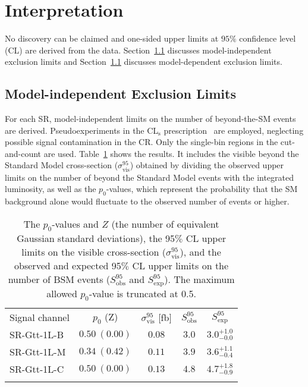 
\section{Interpretation}\label{mbinter}

No discovery can be claimed and one-sided upper limits at $95\%$ confidence
level (CL) are derived from the data. Section~\ref{mb:midel} discusses
model-independent exclusion limits and Section~\ref{mb:midel} discusses
model-dependent exclusion limits.


\subsection{Model-independent Exclusion Limits}\label{mb:midel}

For each SR, model-independent limits on the number of beyond-the-SM events are
derived. Pseudoexperiments in the CL$_{\text{s}}$
prescription~\cite{Read:2002hq} are employed, neglecting possible signal
contamination in the CR. Only the single-bin regions in the cut-and-count are
used. Table~\ref{mod-ind-lim} shows the results. It includes the visible beyond
the Standard Model cross-section ($\sigma_{\text{vis}}^{95}$) obtained by
dividing the observed upper limits on the number of beyond the Standard Model
events with the integrated luminosity, as well as the $p_0$-values, which
represent the probability that the SM background alone would fluctuate to the
observed number of events or higher.

\begin{table}[H]
	\centering
	\small
	\begin{tabular*}{0.6\textwidth}{@{\extracolsep{\fill}}lcccc}
		\noalign{\smallskip}\toprule\noalign{\smallskip}
		Signal channel         & $p_0$ (Z)            & $\sigma^{95}_{\text{vis}}$ [fb]  &  $S_{\text{obs}}^{95}$  & $S_{\text{exp}}^{95}$   \\
		\noalign{\smallskip}\midrule \noalign{\smallskip}
		SR-Gtt-1L-B & $ 0.50~(0.00) $ &  $0.08$ &  $3.0$ & $ { 3.0 }^{ +1.0 }_{ -0.0 }$ \\[1mm]
		SR-Gtt-1L-M & $ 0.34~(0.42)$ &  $0.11$ &  $3.9$ & $ { 3.6 }^{ +1.1 }_{ -0.4 }$ \\[1mm]
		SR-Gtt-1L-C & $ 0.50~(0.00)$ &  $0.13$ &  $4.8$ & $ { 4.7 }^{ +1.8 }_{ -0.9 }$ \\[1mm]
		\noalign{\smallskip}\midrule\noalign{\smallskip}
	\end{tabular*}
	\caption{The $p_0$-values and $Z$ (the number of equivalent Gaussian standard deviations),
	the 95$\%$ CL upper limits on the visible cross-section
	($\sigma^{95}_{\text{vis}}$),
	and the observed and
	expected 95$\%$ CL upper limits on the number of BSM events ($S_{\text{obs}}^{95}$
	and $S_{\text{exp}}^{95}$). The maximum
	allowed $p_0$-value
	is truncated at 0.5.}
	\label{mod-ind-lim}
\end{table}

